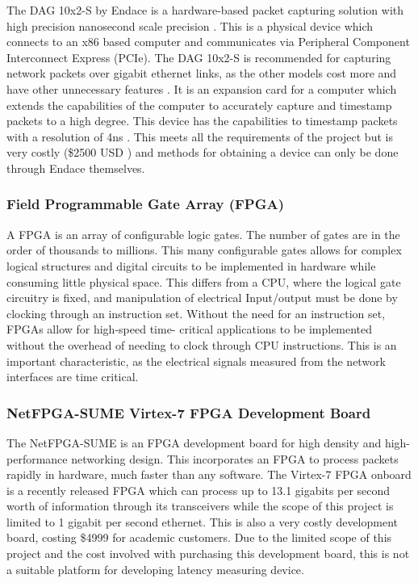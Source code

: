 \par The DAG 10x2-S by Endace is a hardware-based packet capturing solution with high precision nanosecond scale precision \cite{dagprecision}. 
This is a physical device which connects to an x86 based computer and communicates via Peripheral Component Interconnect Express (PCIe). 
The DAG 10x2-S is recommended for capturing network packets over gigabit ethernet links, as the other models cost more and have other unnecessary features \cite{dagfeatures}.
It is an expansion card for a computer which extends the capabilities of the computer to accurately capture and timestamp packets to a high degree. 
This device has the capabilities to timestamp packets with a resolution of 4ns \cite{dagprecision}. 
This meets all the requirements of the project but is very costly (\$2500 USD \cite{dagprice}) and methods for obtaining a device can only be done through Endace themselves. 

\subsubsection{Field Programmable Gate Array (FPGA)}

\par A FPGA is an array of configurable logic gates. The number of gates are in the order of thousands to
millions. This many configurable gates allows for complex logical structures and digital circuits to be
implemented in hardware while consuming little physical space. This differs from a CPU, where the
logical gate circuitry is fixed, and manipulation of electrical Input/output must be done by clocking
through an instruction set. Without the need for an instruction set, FPGAs allow for high-speed time-
critical applications to be implemented without the overhead of needing to clock through CPU
instructions. This is an important characteristic, as the electrical signals measured from the network
interfaces are time critical.

\subsubsection{NetFPGA-SUME Virtex-7 FPGA Development Board}

\par The NetFPGA-SUME is an FPGA development board for high density and high-performance networking design.
This incorporates an FPGA to process packets rapidly in hardware, much faster than any software.
The Virtex-7 FPGA onboard is a recently released FPGA which can process up to 13.1 gigabits per second worth 
of information through its transceivers while the scope of this project is limited to 1 gigabit per second 
ethernet.
This is also a very costly development board, costing \$4999 \cite{SUME} for academic customers. 
Due to the limited scope of this project and the cost involved with purchasing this development board, this is 
not a suitable platform for developing latency measuring device.

